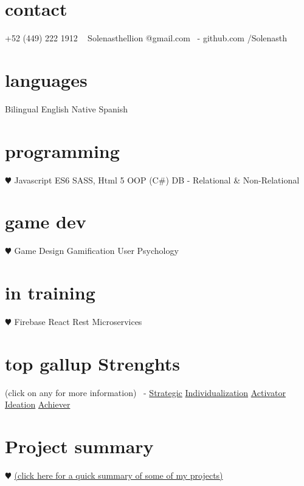\documentclass[]{cv-style}          %
\begin{document}

\lastupdated


\begin{aside}
%
\section{contact}
+52 (449) 222 1912
~
Solenasthellion
@gmail.com
~-
github.com
/Solenasth
%
\section{languages}
Bilingual English
Native Spanish
%
\section{programming}
{\color{red} $\varheartsuit$} Javascript ES6
SASS, Html 5
OOP (C\#)
DB - Relational \& Non-Relational
\section{game dev}
{\color{red} $\varheartsuit$} Game Design
Gamification
User Psychology
\section{in training}
{\color{red} $\varheartsuit$} Firebase
React
Rest Microservices
\section{top gallup Strenghts}
(click on any for more information)
~-
\href{https://news.gallup.com/businessjournal/718/strategic.aspx}{Strategic}
\href{https://news.gallup.com/businessjournal/685/individualization.aspx}{Individualization}
\href{https://news.gallup.com/businessjournal/625/activator.aspx}{Activator}
\href{https://news.gallup.com/businessjournal/679/ideation.aspx}{Ideation}
\href{https://news.gallup.com/businessjournal/622/achiever.aspx}{Achiever}
%
\section{Project summary}
{\color{red} $\varheartsuit$} \href{https://docs.google.com/document/d/1Aj6Jy7RefQvkJJ9pEEydWflzKYrMHOWXZvgLfn9VK6s/edit?usp=sharing}{(click here for a quick summary of some of my projects)}
\end{aside}
\end{document}
